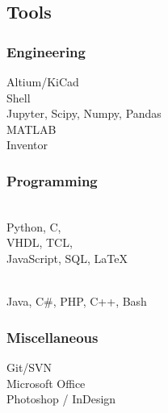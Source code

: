 \documentclass[]{resume}
\begin{document}
\begin{facts}
\subsection{Tools}

\subsubsection{Engineering}
Altium/KiCad\\
Shell\\
Jupyter, Scipy, Numpy, Pandas\\
MATLAB\\
Inventor
\sectionsep

\subsubsection{Programming}
\\
Python, C,\\
VHDL, TCL,\\
JavaScript, SQL, LaTeX
\sectionsep

\\
Java, C\#, PHP, C++, Bash
\sectionsep

\subsubsection{Miscellaneous}
Git/SVN\\
Microsoft Office\\
Photoshop / InDesign
\sectionsep

\end{facts}
\end{document}

